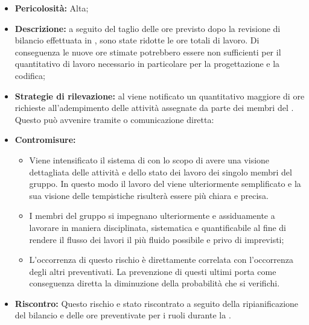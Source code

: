 \label{r_bilancio}
\begin{itemize}
\item \textbf{Pericolosità:} Alta;
\item \textbf{Descrizione:} a seguito del taglio delle ore previsto dopo la revisione di bilancio effettuata in \fC, sono state ridotte le ore totali di lavoro. Di conseguenza le nuove ore stimate potrebbero essere non sufficienti per il quantitativo di lavoro necessario in particolare per la progettazione e la codifica;
\item \textbf{Strategie di rilevazione:} al \rRP viene notificato un quantitativo maggiore di ore richieste all'adempimento delle attività assegnate da parte dei membri del .
Questo può avvenire tramite  o comunicazione diretta:
\item \textbf{Contromisure:}
\begin{itemize}
\item Viene intensificato il sistema di \textit{} con lo scopo di avere una visione dettagliata delle attività e dello stato dei lavoro dei singolo membri del gruppo. In questo modo il lavoro del \rRP viene ulteriormente semplificato e la sua visione delle tempistiche risulterà essere più chiara e precisa.
\item I membri del gruppo si impegnano ulteriormente e assiduamente a lavorare in maniera disciplinata, sistematica e quantificabile al fine di rendere il flusso dei lavori il più fluido possibile e privo di imprevisti;
\item L'occorrenza di questo rischio è direttamente correlata con l'occorrenza degli altri preventivati. La prevenzione di questi ultimi porta come conseguenza diretta la diminuzione della probabilità che si verifichi.
\end{itemize}
\item \textbf{Riscontro:}
Questo rischio e stato riscontrato a seguito della ripianificazione del bilancio e delle ore preventivate per i ruoli durante la \fC.
\end{itemize}
